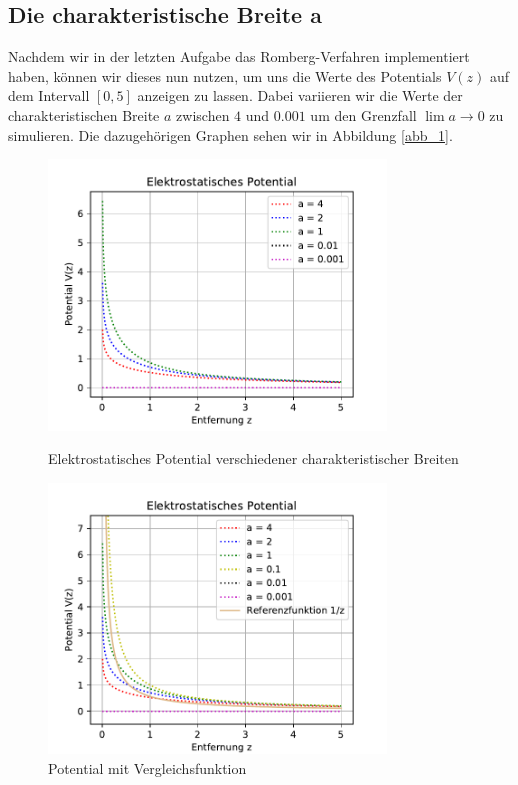 \documentclass[12pt,a4paper]{article}
\begin{document}
\subsection{Die charakteristische Breite a}
Nachdem wir in der letzten Aufgabe das Romberg-Verfahren implementiert haben, können wir dieses nun nutzen, um uns die Werte des Potentials $V(z)$ auf dem Intervall $[0,5]$ anzeigen zu lassen. Dabei variieren wir die Werte der charakteristischen Breite $a$ zwischen $4$ und $0.001$ um den Grenzfall $\lim a \rightarrow 0$ zu simulieren. Die dazugehörigen Graphen sehen wir in Abbildung \ref{abb_1}.
\begin{figure}[htbp]
	\includegraphics[width=0.8\textwidth]{aufgabe1.pdf}
	\caption{Elektrostatisches Potential verschiedener charakteristischer Breiten}\label{abb_1}
	\includegraphics[width=0.8\textwidth]{aufgabe1_referenzpot.pdf}
	\caption{Potential mit Vergleichsfunktion}\label{abb_2}
\end{figure}
\end{document}
